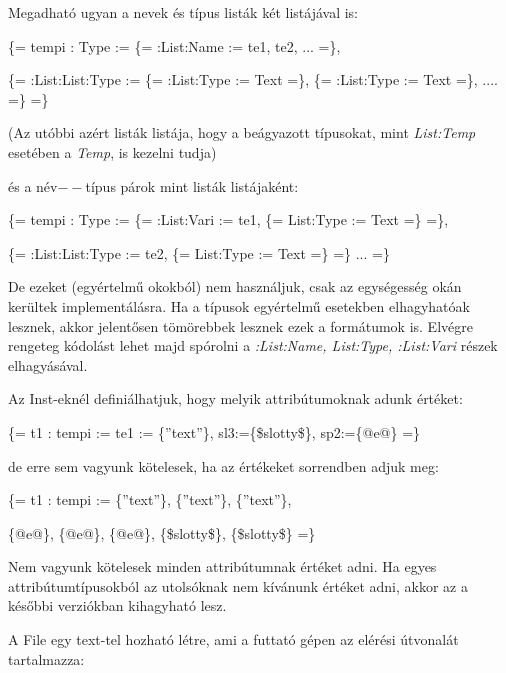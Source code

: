 Megadható ugyan a nevek és típus listák két listájával is:

\{= tempi : Type := \{= :List:Name := te1, te2, ... =\}, 

\{= :List:List:Type := \{= :List:Type := Text =\}, \{= :List:Type := Text =\}, .... =\} =\}

(Az utóbbi azért listák listája, hogy a beágyazott típusokat, mint \textit{List:Temp} esetében a \textit{Temp}, is kezelni tudja)  

és a név$--$típus párok mint listák listájaként:

\{= tempi : Type := \{= :List:Vari := te1, \{= List:Type := Text =\} =\}, 

\{= :List:List:Type := te2, \{= List:Type := Text =\} =\} ... =\}

De ezeket (egyértelmű okokból) nem használjuk, csak az egységesség okán kerültek implementálásra.
Ha a típusok egyértelmű esetekben elhagyhatóak lesznek, akkor jelentősen tömörebbek lesznek ezek a formátumok is.
Elvégre rengeteg kódolást lehet majd spórolni a \textit{:List:Name, List:Type, :List:Vari} részek elhagyásával.

Az Inst-eknél definiálhatjuk, hogy melyik attribútumoknak adunk értéket:

\{= t1 : tempi := te1 := \{”text”\}, sl3:=\{\$slotty\$\}, sp2:=\{@e@\} =\}

de erre sem vagyunk kötelesek, ha az értékeket sorrendben adjuk meg:

\{= t1 : tempi := \{”text”\}, \{”text”\}, \{”text”\}, 

\{@e@\}, \{@e@\}, \{@e@\}, \{\$slotty\$\}, \{\$slotty\$\} =\}

Nem vagyunk kötelesek minden attribútumnak értéket adni.
Ha egyes attribútumtípusokból az utolsóknak nem kívánunk értéket adni, akkor az a későbbi verziókban kihagyható lesz.

A File egy text-tel hozható létre, ami a futtató gépen az elérési útvonalát tartalmazza:

